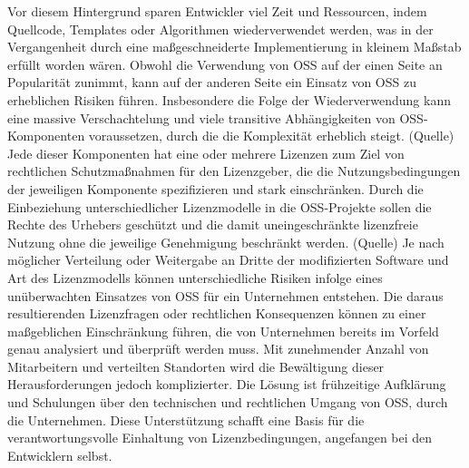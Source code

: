 Vor diesem Hintergrund sparen Entwickler viel Zeit und Ressourcen, indem Quellcode, Templates oder Algorithmen wiederverwendet werden, was in der Vergangenheit durch eine maßgeschneiderte Implementierung in kleinem Maßstab erfüllt worden wären. \cite{spinellis_how_2004} Obwohl die Verwendung von OSS auf der einen Seite an Popularität zunimmt, kann auf der anderen Seite ein Einsatz von OSS zu erheblichen Risiken führen. Insbesondere die Folge der Wiederverwendung kann eine massive Verschachtelung und viele transitive Abhängigkeiten von OSS-Komponenten voraussetzen, durch die die Komplexität erheblich steigt. (Quelle) Jede dieser Komponenten hat eine oder mehrere Lizenzen zum Ziel von rechtlichen Schutzmaßnahmen für den Lizenzgeber, die die Nutzungsbedingungen der jeweiligen Komponente spezifizieren und stark einschränken. Durch die Einbeziehung unterschiedlicher Lizenzmodelle in die OSS-Projekte sollen die Rechte des Urhebers geschützt und die damit uneingeschränkte lizenzfreie Nutzung ohne die jeweilige Genehmigung beschränkt werden. (Quelle) Je nach möglicher Verteilung oder Weitergabe an Dritte der modifizierten Software und Art des Lizenzmodells können unterschiedliche Risiken infolge eines unüberwachten Einsatzes von OSS für ein Unternehmen entstehen. Die daraus resultierenden Lizenzfragen oder rechtlichen Konsequenzen können zu einer maßgeblichen Einschränkung führen, die von Unternehmen bereits im Vorfeld genau analysiert und überprüft werden muss. Mit zunehmender Anzahl von Mitarbeitern und verteilten Standorten wird die Bewältigung dieser Herausforderungen jedoch komplizierter. Die Lösung ist frühzeitige Aufklärung und Schulungen über den technischen und rechtlichen Umgang von OSS, durch die Unternehmen. Diese Unterstützung schafft eine Basis für die verantwortungsvolle Einhaltung von Lizenzbedingungen, angefangen bei den Entwicklern selbst. 

